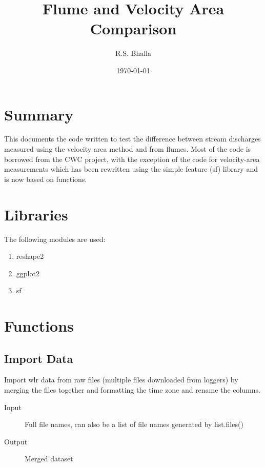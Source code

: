 \documentclass[a4paper]{article}
\author{R.S. Bhalla}
\date{\today}
\title{Flume and Velocity Area Comparison}
\begin{document}
\maketitle
\setcounter{tocdepth}{2}
\tableofcontents



\section*{Summary}
\label{sec:org519a555}

This documents the code written to test the difference between stream discharges measured using the velocity area method and from flumes.
Most of the code is borrowed from the CWC project, with the exception of the code for velocity-area measurements which has been rewritten using the simple feature (sf) library and is now based on functions. 

\section*{Libraries}
\label{sec:org07fa2c1}

The following modules are used:

\begin{enumerate}
\item reshape2
\item ggplot2
\item sf
\end{enumerate}

\section*{Functions}
\label{sec:org627cbc6}

\subsection*{Import Data}
\label{sec:orgfa497ea}

Import wlr data from raw files (multiple files downloaded from loggers) by merging the files together and formatting the time zone and rename the columns.

\begin{description}
\item[{Input}] Full file names, can also be a list of file names generated by list.files()
\item[{Output}] Merged dataset
\end{description}
\end{document}
